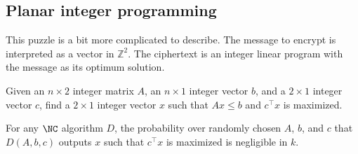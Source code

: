 \documentclass{article}
\begin{document}
\subsection{Planar integer programming}

This puzzle is a bit more complicated to describe.
The message to encrypt is interpreted as a vector in $\mathbb{Z}^2$.
The ciphertext is an integer linear program with the message as its optimum solution.

\begin{definition}
  Given an $n \times 2$ integer matrix $A$, an $n \times 1$ integer vector $b$, and a $2 \times 1$ integer vector $c$, find a $2 \times 1$ integer vector $x$ such that $Ax \leq b$ and $c^\intercal x$ is maximized.
\end{definition}

\begin{assumption}
  For any $\NC$ algorithm $D$, the probability over randomly chosen $A$, $b$, and $c$ that $D(A, b, c)$ outputs $x$ such that $c^\intercal x$ is maximized is negligible in $k$.
\end{assumption}
\end{document}
